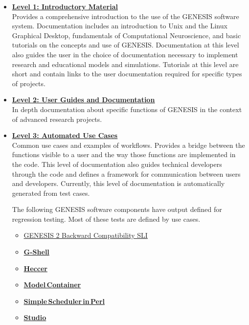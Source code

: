 \documentclass[12pt]{article}
\begin{document}
\begin{itemize}

\item[]\href{../contents-level1/contents-level1.tex}{\bf \underline{Level 1: Introductory Material}}\\
Provides a comprehensive
  introduction to the use of the GENESIS software system.
  Documentation includes an introduction to Unix and the Linux
  Graphical Desktop, fundamentals of Computational Neuroscience, and
  basic tutorials on the concepts and use of GENESIS. Documentation at
  this level also guides the user in the choice of documentation
  necessary to implement research and educational models and
  simulations.  Tutorials at this level are short and contain links to
  the user documentation required for specific types of projects.

\item[]\href{../contents-level2/contents-level2.tex}{\bf \underline{Level 2: User Guides and Documentation}}\\
 In depth
  documentation about specific functions of GENESIS in the context of
  advanced research projects.

\item[]\href{../contents-level3/contents-level3.tex}{\bf \underline{Level 3: Automated Use Cases}}\\
  Common use cases and examples
  of workflows. Provides a bridge between the functions visible to a user and
  the way those functions are implemented in the code.  This level of documentation also guides technical developers through the code and defines a
  framework for communication between users and developers.
  Currently, this level of documentation is automatically generated
  from test cases.
  
The following GENESIS software components have output defined for regression testing. Most of these tests are defined by use cases.
\begin{itemize}
\item[]\href{../tests-g2-backward-compatibility/tests-g2-backward-compatibility.tex}{GENESIS 2 Backward Compatibility SLI}
\item[]\href{../tests-gshell/tests-gshell.tex}{\bf G-Shell}
\item[]\href{../tests-heccer/tests-heccer.tex}{\bf Heccer}
\item[]\href{../tests-model-container/model-container.tex}{\bf Model\,Container}
\item[]\href{../tests-ssp/tests-ssp.tex}{\bf Simple\,Scheduler\,in\,Perl}
\item[]\href{../tests-studio/tests-studio.tex}{\bf Studio}
\end{itemize}
  

\end{itemize}
\end{document}
